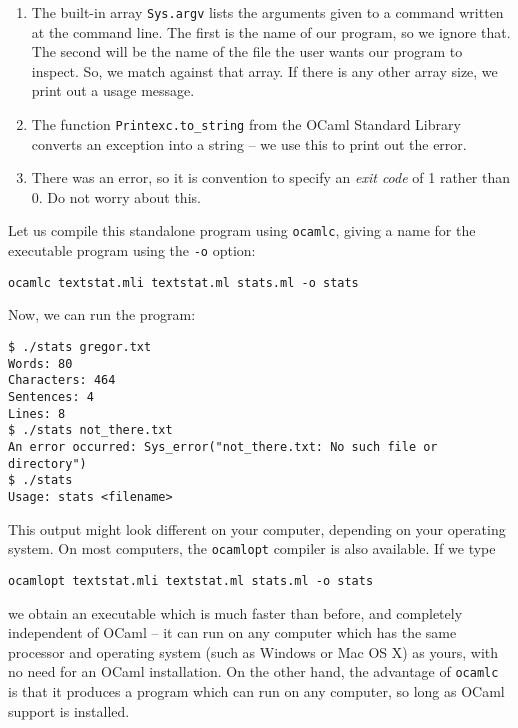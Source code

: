 \documentclass[]{book}
\newcommand{\smspace}{\vspace{4mm}}
\begin{document}
\begin{enumerate}
  \item The built-in array \texttt{Sys.argv} lists the arguments given to a command written at the command line. The first is the name of our program, so we ignore that. The second will be the name of the file the user wants our program to inspect. So, we match against that array. If there is any other array size, we print out a usage message.
  \item The function \texttt{Printexc.to\_string} from the OCaml Standard Library converts an exception into a string -- we use this to print out the error.
  \item There was an error, so it is convention to specify an \textit{exit code} of 1 rather than 0. Do not worry about this.
\end{enumerate}

\noindent Let us compile this standalone program using \texttt{ocamlc}, giving a name for the executable program using the \texttt{-o} option:

\smspace
{}\texttt{ocamlc textstat.mli textstat.ml stats.ml -o stats}
\smspace

\noindent Now, we can run the program:

\smspace
\noindent\texttt{\$ ./stats gregor.txt}\\
\noindent\texttt{Words:\ 80}\\
\noindent\texttt{Characters:\ 464}\\
\noindent\texttt{Sentences:\ 4}\\
\noindent\texttt{Lines:\ 8}\\

\noindent\texttt{\$ ./stats not\_there.txt}\\
\noindent\texttt{An error occurred:\ Sys\_error("not\_there.txt: No such file or directory")}\\

\noindent\texttt{\$ ./stats}\\
\noindent\texttt{Usage:\ stats <filename>}\vphantom{g}
\smspace

\noindent This output might look different on your computer, depending on your operating system. On most computers, the \texttt{ocamlopt} compiler is also available. If we type

\smspace
\texttt{ocamlopt textstat.mli textstat.ml stats.ml -o stats}
\smspace

\noindent we obtain an executable which is much faster than before, and completely independent of OCaml -- it can run on any computer which has the same processor and operating system (such as Windows or Mac OS X) as yours, with no need for an OCaml installation. On the other hand, the advantage of \texttt{ocamlc} is that it produces a program which can run on any computer, so long as OCaml support is installed.
\end{document}
